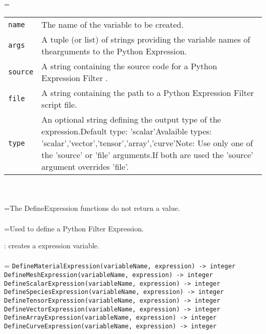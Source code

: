 \documentclass[10pt,a4paper]{report}
\begin{document}
 \\ 
\hangindent=\parindent 
\begin{tabular}{lp{9cm}}
\verb!name! & The name of the variable to be created. \\
\verb!args! & A tuple (or list) of strings providing the variable names of thearguments to the Python Expression. \\
\verb!source! & A string containing the source code for a Python Expression Filter . \\
\verb!file! & A string containing the path to a Python Expression Filter script file. \\
\verb!type! & An optional string defining the output type of the expression.Default type: 'scalar'Avalaible types: 'scalar','vector','tensor','array','curve'Note: Use only one of the 'source' or 'file' arguments.If both are used the 'source' argument overrides 'file'. \\
\end{tabular} \\[-2mm]


 \\ 
\hangindent=\parindent The DefineExpression functions do not return a value. \\[-3mm] 

 \\ 
\hangindent=\parindent Used to define a Python Filter Expression. \\[-3mm] 

\newpage


{}
: creates a expression variable.\\[-3mm]

 \\ 
\hangindent=\parindent 
\verb!DefineMaterialExpression(variableName, expression) -> integer!\\ 
\verb!DefineMeshExpression(variableName, expression) -> integer!\\ 
\verb!DefineScalarExpression(variableName, expression) -> integer!\\ 
\verb!DefineSpeciesExpression(variableName, expression) -> integer!\\ 
\verb!DefineTensorExpression(variableName, expression) -> integer!\\ 
\verb!DefineVectorExpression(variableName, expression) -> integer!\\ 
\verb!DefineArrayExpression(variableName, expression) -> integer!\\ 
\verb!DefineCurveExpression(variableName, expression) -> integer!\\ [-3mm]
\end{document}
